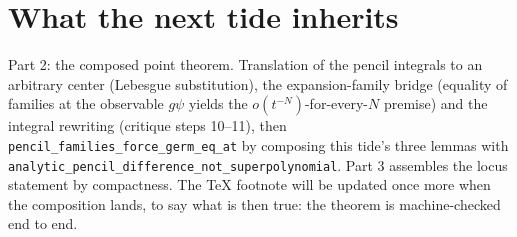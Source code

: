 \documentclass[11pt]{article}
\newcommand{\code}[1]{\texttt{#1}}
\begin{document}
\section{What the next tide inherits}

Part 2: the composed point theorem. Translation of the pencil
integrals to an arbitrary center (Lebesgue substitution), the
expansion-family bridge (equality of families at the observable
$g\psi$ yields the $o(t^{-N})$-for-every-$N$ premise) and the
integral rewriting (critique steps 10--11), then
\code{pencil\_families\_force\_germ\_eq\_at} by composing this
tide's three lemmas with
\code{analytic\_pencil\_difference\_not\_superpolynomial}. Part 3
assembles the locus statement by compactness. The TeX footnote will
be updated once more when the composition lands, to say what is then
true: the theorem is machine-checked end to end.
\end{document}
